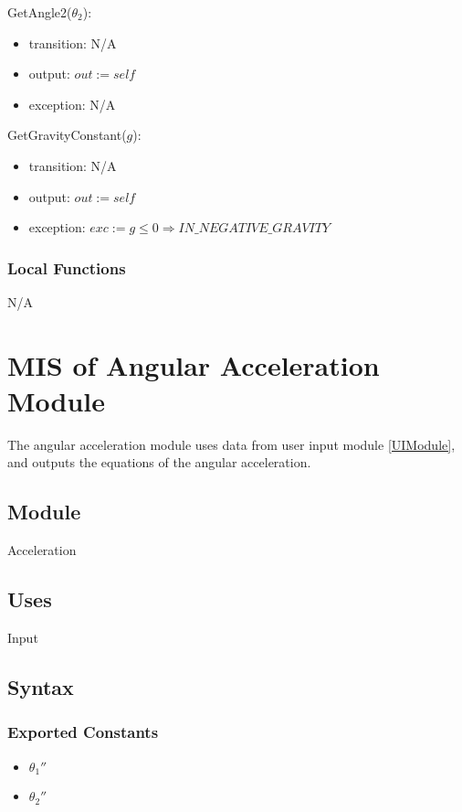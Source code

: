 \documentclass[12pt, titlepage]{article}
\begin{document}
\noindent GetAngle2($\theta_2$):
\begin{itemize}
\item transition: N/A
\item output: $out := self$
\item exception: N/A
\end{itemize}


\noindent GetGravityConstant($g$):
\begin{itemize}
\item transition: N/A
\item output: $out := self$
\item exception: $exc := g \leq 0 \Rightarrow IN\_NEGATIVE\_GRAVITY$
\end{itemize}

\subsubsection{Local Functions}
N/A

\newpage


\section{MIS of Angular Acceleration Module} \label{AAModule} 
The angular acceleration module uses data from user input module \ref{UIModule}, and outputs the equations of the angular acceleration. 

\subsection{Module}
Acceleration

\subsection{Uses}
Input

\subsection{Syntax}

\subsubsection{Exported Constants}
\begin{itemize}
  \item ${\theta_1}''$
  \item ${\theta_2}''$
\end{itemize}
\end{document}
